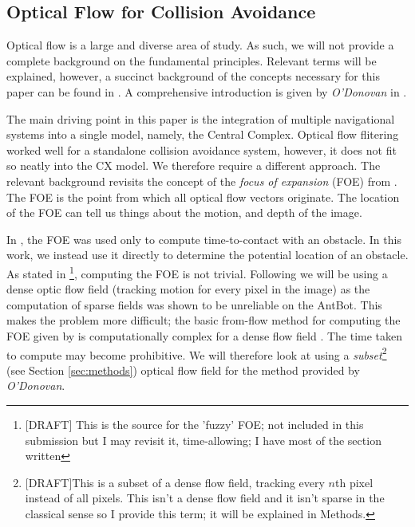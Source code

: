 \documentclass[a4paper,11pt,twoside,openright]{article}
\begin{document}
\subsection{ Optical Flow for Collision Avoidance } \label{OFBackground}
Optical flow is a large and diverse area of study. As such, we will not provide
a complete background on the fundamental principles. Relevant terms will be
explained, however, a succinct background of the concepts necessary for this
paper can be found in \cite{Mitchell2018}. A comprehensive introduction is
given by \textit{O'Donovan} in \cite{ODonovan2005}.
\newline
\par

The main driving point in this paper is the integration of multiple navigational
systems into a single model, namely, the Central Complex.
Optical flow flitering worked well for a standalone collision avoidance system,
however, it does not fit so neatly into the CX model. We therefore require a
different approach. The relevant background revisits the concept of the
\textit{focus of expansion} (FOE) from \cite{Mitchell2018, ODonovan2005}.
The FOE is the point from which all optical flow vectors originate. The location
of the FOE can tell us things about the motion, and depth of the image.
\newline
\par

In \cite{Mitchell2018}, the FOE was used only to compute time-to-contact
with an obstacle. In this work, we instead use it directly to determine the
potential location of an obstacle. As stated in \cite{Burger1989}
\footnote{[DRAFT] This is the source for the 'fuzzy' FOE; not included in this
  submission
  but I may revisit it, time-allowing; I have most of the section written},
computing the
FOE is not trivial. Following \cite{Mitchell2018} we will be using a dense
optic flow field (tracking motion for every pixel in the image) as the
computation of sparse fields was shown to be unreliable on the AntBot. This makes
the problem more difficult; the basic from-flow method for computing the FOE
given by \cite{ODonovan2005} is computationally complex for a dense flow field
\cite{Mitchell2018}. The time taken to compute may become prohibitive. We will
therefore look at using a \textit{subset}\footnote{[DRAFT]This is a subset of a
  dense flow field, tracking every $n$th pixel instead of all pixels. This isn't a
  dense flow field and it isn't sparse in the classical sense so I provide this
  term; it will be explained in Methods.} (see Section \ref{sec:methods}) optical
flow field for the method provided by \textit{O'Donovan}.
\end{document}
